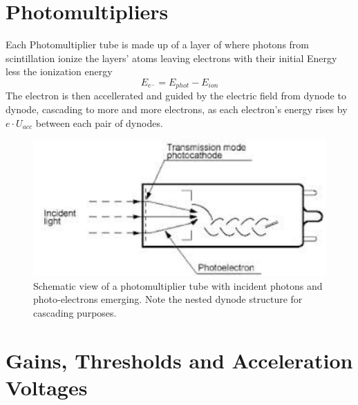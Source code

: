   \section{Photomultipliers}
  \label{ch:The muon detection system:sec:Photomultipliers}
  Each Photomultiplier tube is made up of a layer of  where photons from scintillation ionize the layers' atoms leaving electrons with their initial Energy less the ionization energy 
  $$E_{e^-} = E_{phot} - E_{ion}$$
  The electron is then accellerated and guided by the electric field from dynode to dynode, cascading to more and more electrons, as each electron's energy rises by $e\cdot U_{acc}$ between each pair of dynodes.
  \begin{figure}
  	\centering
  	\includegraphics[width = 0.5 \textwidth]{graphics/setup/PMT.pdf}
  	\caption{Schematic view of a photomultiplier tube with incident photons and photo-electrons emerging. Note the nested dynode structure for cascading purposes.}
  \end{figure}

  
  
  \section{Gains, Thresholds and Acceleration Voltages}
  \label{ch:The muon detection system:sec:Gains, Thresholds and Acceleration Voltages}

